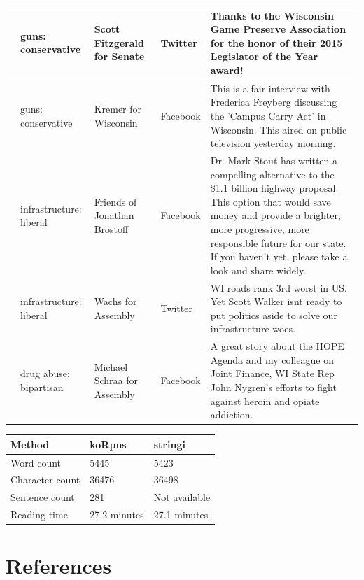\documentclass[12pt,]{article}
\begin{document}
\begin{longtable}[t]{>{\raggedright\arraybackslash}p{.65in}|>{\raggedright\arraybackslash}p{.6in}|>{\raggedright\arraybackslash}p{.7in}|>{\raggedright\arraybackslash}p{.6in}|>{\raggedright\arraybackslash}p{3in}}
\hline
8 & guns: conservative & Scott Fitzgerald for Senate & Twitter & Thanks to the Wisconsin Game Preserve Association for the honor of their 2015 Legislator of the Year award!\\
\hline
9 & guns: conservative & Kremer for Wisconsin & Facebook & This is a fair interview with Frederica Freyberg discussing the 'Campus Carry Act' in Wisconsin.  This aired on public television yesterday morning.\\
\hline
10 & infrastructure: liberal & Friends of Jonathan Brostoff & Facebook & Dr. Mark Stout has written a compelling alternative to the \$1.1 billion highway proposal. This option that would save money and provide a brighter, more progressive, more responsible future for our state. If you haven't yet, please take a look and share widely.\\
\hline
11 & infrastructure: liberal & Wachs for Assembly & Twitter & WI roads rank 3rd worst in US. Yet Scott Walker isnt ready to put politics aside to solve our infrastructure woes.\\
\hline
12 & drug abuse: bipartisan & Michael Schraa for Assembly & Facebook & A great story about the HOPE Agenda and my colleague on Joint Finance, WI State Rep John Nygren's efforts to fight against heroin and opiate addiction.\\
\hline
\end{longtable}

\begin{tabular}{l|l|l}
\hline
Method & koRpus & stringi\\
\hline
Word count & 5445 & 5423\\
\hline
Character count & 36476 & 36498\\
\hline
Sentence count & 281 & Not available\\
\hline
Reading time & 27.2 minutes & 27.1 minutes\\
\hline
\end{tabular}

\hypertarget{references}{%
\section*{References}\label{references}}
\end{document}
